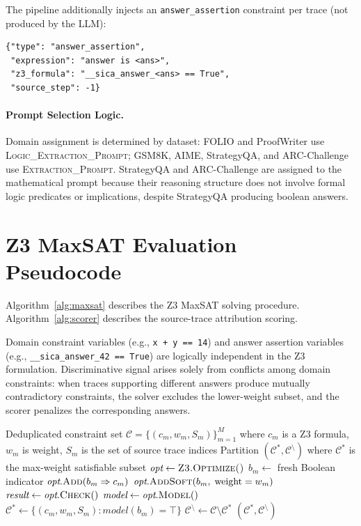 The pipeline additionally injects an \texttt{answer\_assertion} constraint per trace (not produced by the LLM):

\begin{lstlisting}
{"type": "answer_assertion",
 "expression": "answer is <ans>",
 "z3_formula": "__sica_answer_<ans> == True",
 "source_step": -1}
\end{lstlisting}

\paragraph{Prompt Selection Logic.}

Domain assignment is determined by dataset: FOLIO and ProofWriter use \textsc{Logic\_Extraction\_Prompt}; GSM8K, AIME, StrategyQA, and ARC-Challenge use \textsc{Extraction\_Prompt}. StrategyQA and ARC-Challenge are assigned to the mathematical prompt because their reasoning structure does not involve formal logic predicates or implications, despite StrategyQA producing boolean answers.


\section{Z3 MaxSAT Evaluation Pseudocode}
\label{app:z3-pseudocode}

Algorithm~\ref{alg:maxsat} describes the Z3 MaxSAT solving procedure. Algorithm~\ref{alg:scorer} describes the source-trace attribution scoring.

Domain constraint variables (e.g., \texttt{x + y == 14}) and answer assertion variables (e.g., \texttt{\_\_sica\_answer\_42 == True}) are logically independent in the Z3 formulation. Discriminative signal arises solely from conflicts among domain constraints: when traces supporting different answers produce mutually contradictory constraints, the solver excludes the lower-weight subset, and the scorer penalizes the corresponding answers.

\begin{algorithm}[h]
\caption{Z3 Weighted Partial MAX-SAT}
\label{alg:maxsat}
\begin{algorithmic}[1]
\Require Deduplicated constraint set $\mathcal{C} = \{(c_m, w_m, S_m)\}_{m=1}^M$ where $c_m$ is a Z3 formula, $w_m$ is weight, $S_m$ is the set of source trace indices
\Ensure Partition $(\mathcal{C}^*, \mathcal{C}^{\setminus})$ where $\mathcal{C}^*$ is the max-weight satisfiable subset
\State $\textit{opt} \gets \textsc{Z3.Optimize()}$
    \State $b_m \gets$ fresh Boolean indicator
    \State $\textit{opt}.\textsc{Add}(b_m \Rightarrow c_m)$ 
    \State $\textit{opt}.\textsc{AddSoft}(b_m,\; \text{weight}=w_m)$
\EndFor
\State $\textit{result} \gets \textit{opt}.\textsc{Check}()$
\State $\textit{model} \gets \textit{opt}.\textsc{Model}()$
\State $\mathcal{C}^* \gets \{(c_m, w_m, S_m) : \textit{model}(b_m) = \top\}$
\State $\mathcal{C}^{\setminus} \gets \mathcal{C} \setminus \mathcal{C}^*$
\State \Return $(\mathcal{C}^*, \mathcal{C}^{\setminus})$
\end{algorithmic}
\end{algorithm}

